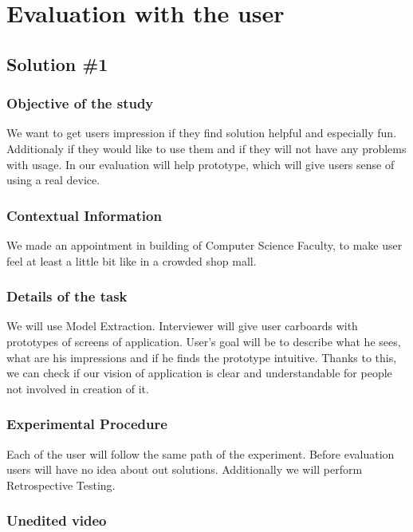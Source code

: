 
\begingroup
\let\clearpage\relax
	\chapter{Evaluation with the user}
\endgroup

\section{Solution \#1}
\subsection{Objective of the study}
 We want to get users impression if they find solution helpful and especially fun. Additionaly if they would like to use them and if they will not have any problems with usage. In our evaluation will help prototype, which will give users sense of using a real device.

\subsection{Contextual Information}
We made an appointment in building of Computer Science Faculty, to make user feel at least a little bit like in a crowded shop mall.

\subsection{Details of the task}
We will use Model Extraction. Interviewer will give user carboards with prototypes of screens of application. User's goal will be to describe what he sees, what are his impressions and if he finds the prototype intuitive. Thanks to this, we can check if our vision of application is clear and understandable for people not involved in creation of it.

\subsection{Experimental Procedure}
Each of the user will follow the same path of the experiment. Before evaluation users will have no idea about out solutions. Additionally we will perform Retrospective Testing.

\subsection{Unedited video}

